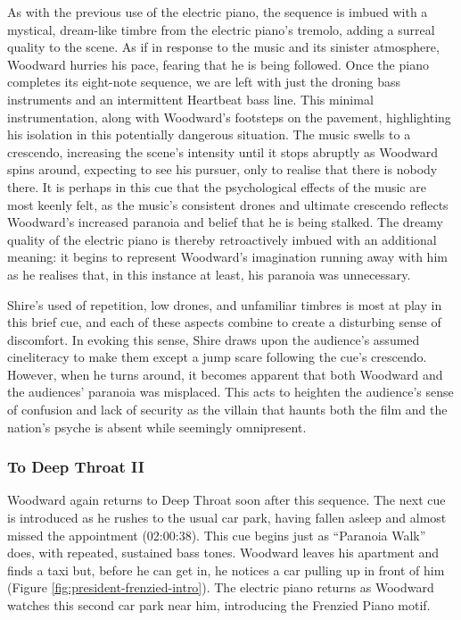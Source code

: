 As with the previous use of the electric piano, the sequence is imbued with a mystical, dream-like timbre from the electric piano's tremolo, adding a surreal quality to the scene.
As if in response to the music and its sinister atmosphere, Woodward hurries his pace, fearing that he is being followed.
Once the piano completes its eight-note sequence, we are left with just the droning bass instruments and an intermittent Heartbeat bass line.
This minimal instrumentation, along with Woodward’s footsteps on the pavement, highlighting his isolation in this potentially dangerous situation.
The music swells to a crescendo, increasing the scene's intensity until it stops abruptly as Woodward spins around, expecting to see his pursuer, only to realise that there is nobody there.
It is perhaps in this cue that the psychological effects of the music are most keenly felt, as the music's consistent drones and ultimate crescendo reflects Woodward's increased paranoia and belief that he is being stalked.
The dreamy quality of the electric piano is thereby retroactively imbued with an additional meaning: it begins to represent Woodward’s imagination running away with him as he realises that, in this instance at least, his paranoia was unnecessary.

Shire's used of repetition, low drones, and unfamiliar timbres is most at play in this brief cue, and each of these aspects combine to create a disturbing sense of discomfort. 
In evoking this sense, Shire draws upon the audience’s assumed cineliteracy to make them except a jump scare following the cue’s crescendo.
However, when he turns around, it becomes apparent that both Woodward and the audiences’ paranoia was misplaced.
This acts to heighten the audience's sense of confusion and lack of security as the villain that haunts both the film and the nation's psyche is absent while seemingly omnipresent.




\subsubsection{To Deep Throat II}

Woodward again returns to Deep Throat soon after this sequence.
The next cue is introduced as he rushes to the usual car park, having fallen asleep and almost missed the appointment (02:00:38).
This cue begins just as ``Paranoia Walk” does, with repeated, sustained bass tones.
Woodward leaves his apartment and finds a taxi but, before he can get in, he notices a car pulling up in front of him (Figure \ref{fig:president-frenzied-intro}).
The electric piano returns as Woodward watches this second car park near him, introducing the Frenzied Piano motif.

